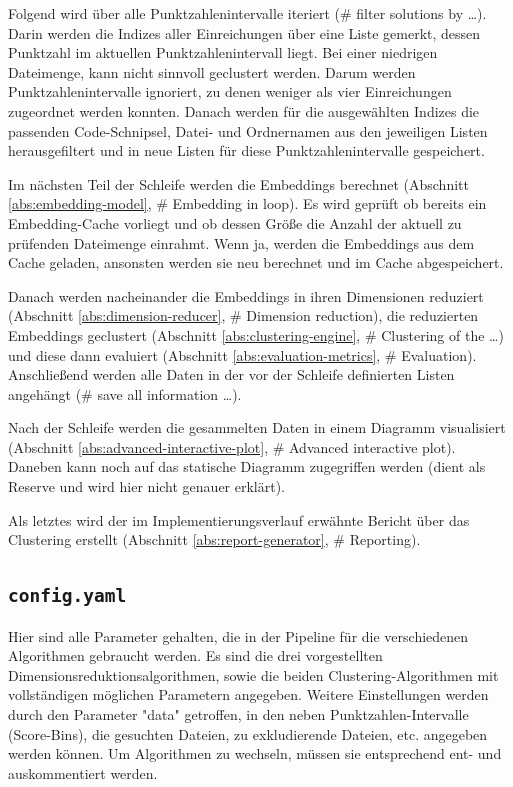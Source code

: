 Folgend wird über alle Punktzahlenintervalle iteriert (\# filter solutions by \dots). Darin werden die Indizes aller Einreichungen über eine Liste gemerkt, dessen Punktzahl im aktuellen Punktzahlenintervall liegt. Bei einer niedrigen Dateimenge, kann nicht sinnvoll geclustert werden. Darum werden Punktzahlenintervalle ignoriert, zu denen weniger als vier Einreichungen zugeordnet werden konnten. Danach werden für die ausgewählten Indizes die passenden Code-Schnipsel, Datei- und Ordnernamen aus den jeweiligen Listen herausgefiltert und in neue Listen für diese Punktzahlenintervalle gespeichert.

Im nächsten Teil der Schleife werden die Embeddings berechnet (Abschnitt \ref{abs:embedding-model}, \# Embedding in loop). Es wird geprüft ob bereits ein Embedding-Cache vorliegt und ob dessen Größe die Anzahl der aktuell zu prüfenden Dateimenge einrahmt. Wenn ja, werden die Embeddings aus dem Cache geladen, ansonsten werden sie neu berechnet und im Cache abgespeichert.

Danach werden nacheinander die Embeddings in ihren Dimensionen reduziert (Abschnitt \ref{abs:dimension-reducer}, \# Dimension reduction), die reduzierten Embeddings geclustert (Abschnitt \ref{abs:clustering-engine}, \# Clustering of the \dots) und diese dann evaluiert (Abschnitt \ref{abs:evaluation-metrics}, \# Evaluation). Anschließend werden alle Daten in der vor der Schleife definierten Listen angehängt (\# save all information \dots).

Nach der Schleife werden die gesammelten Daten in einem Diagramm visualisiert (Abschnitt \ref{abs:advanced-interactive-plot}, \# Advanced interactive plot). Daneben kann noch auf das statische Diagramm zugegriffen werden (dient als Reserve und wird hier nicht genauer erklärt).

Als letztes wird der im Implementierungsverlauf erwähnte Bericht über das Clustering erstellt (Abschnitt \ref{abs:report-generator}, \# Reporting).


\subsection{\texttt{config.yaml}}
\label{abs:config.yaml}
Hier sind alle Parameter gehalten, die in der Pipeline für die verschiedenen Algorithmen gebraucht werden. Es sind die drei vorgestellten Dimensionsreduktionsalgorithmen, sowie die beiden Clustering-Algorithmen mit vollständigen möglichen Parametern angegeben. Weitere Einstellungen werden durch den Parameter "data" getroffen, in den neben Punktzahlen-Intervalle (Score-Bins), die gesuchten Dateien, zu exkludierende Dateien, etc. angegeben werden können. Um Algorithmen zu wechseln, müssen sie entsprechend ent- und auskommentiert werden.



